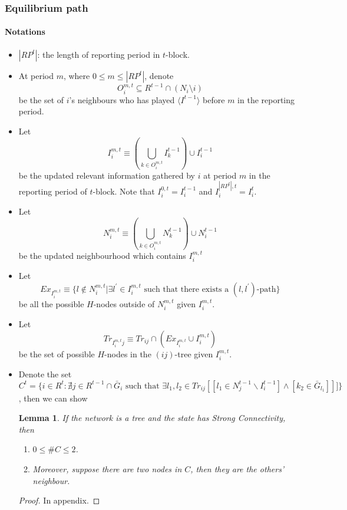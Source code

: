 \documentclass[12pt]{article}
\newtheorem{lemma}{Lemma}[subsection]
\theoremstyle{remark}
\theoremstyle{remark}
\begin{document}
\subsubsection{Equilibrium path}



\paragraph{Notations}

\begin{itemize}
\item $|RP^t|$: the length of reporting period in $t$-block.
\item At period $m$, where $0\leq m \leq |RP^t|$, denote 
\[O^{m,t}_i\subseteq R^{t-1}\cap (N_i\setminus i)\] be the set of $i$'s neighbours who has played $\langle I^{t-1} \rangle$ before $m$ in the reporting period. 
\item Let
\[I^{m,t}_i\equiv (\bigcup_{k\in O^{m,t}_i} I^{t-1}_k)\cup I^{t-1}_i\]
be the updated relevant information gathered by $i$ at period $m$ in the reporting period of $t$-block. Note that $I^{0,t}_i=I^{t-1}_i$ and $I^{|RP^t|,t}_i=I^{t}_i$.
\item Let
\[N^{m,t}_i\equiv (\bigcup_{k\in O^{m,t}_i} N^{t-1}_k)\cup N^{t-1}_i\]
be the updated neighbourhood which contains $I^{m,t}_i$
\item Let 
\[Ex_{I^{m,t}_i}\equiv \{l\notin N^{m,t}_i|\exists l^{'}\in I^{m,t}_i\text{ such that there exists a $(l,l^{'})$-path}\}\]
be all the possible $H$-nodes outside of $N^{m,t}_i$ given $I^{m,t}_i$.

\item Let
\[Tr_{I^{m,t}_ij}\equiv Tr_{ij}\cap (Ex_{I^{m,t}_i}\cup I^{m,t}_i)\]
be the set of possible $H$-nodes in the $(ij)$-tree given $I^{m,t}_i$. 

\item Denote the set
\[C^t=\{i\in R^t:\nexists j\in R^{t-1}\cap \bar{G}_i \text{ such that }\exists l_1,l_2\in Tr_{ij}[[l_1\in N^{t-1}_j\backslash I^{t-1}_i] \wedge [k_2\in \bar{G}_{l_1}]]]\}\]
, then we can show 

\begin{lemma}
\label{lemma_at_most_two_nodes}
If the network is a tree and the state has Strong Connectivity, then 
\begin{enumerate}
\item $0\leq \# C \leq 2$.
\item Moreover, suppose there are two nodes in $C$, then they are the others' neighbour.
\end{enumerate}
\end{lemma}
\begin{proof}
In appendix.
\end{proof}


\end{itemize}
\end{document}
